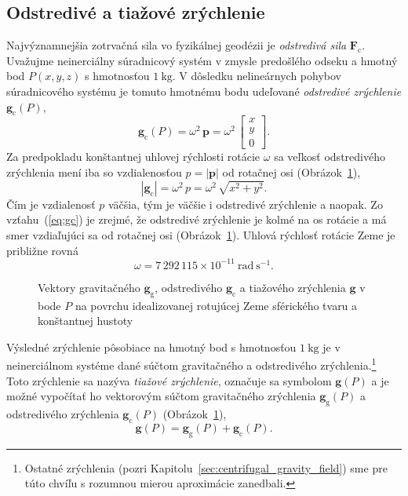 \documentclass[a4paper, 12pt]{book}
\newcommand{\gidx}{\mathrm g}
\newcommand{\cidx}{\mathrm c}
\let\vec\mathbf
\begin{document}
\subsection{Odstredivé a tiažové zrýchlenie}

Najvýznamnejšia zotrvačná sila vo fyzikálnej geodézii je \emph{odstredivá sila} 
$\vec F_\cidx$.  Uvažujme neinerciálny súradnicový systém v zmysle predošlého 
odseku a hmotný bod $P(x, y, z)$ s hmotnosťou $1\ \mathrm{kg}$.  V dôsledku 
nelineárnych pohybov súradnicového systému je tomuto hmotnému bodu udeľované 
\emph{odstredivé zrýchlenie} $\vec g_\cidx(P)$,
%
\begin{equation}
\label{eq:gc}
\vec g_\cidx(P) = \omega^2 \, \vec p =
%
\omega^2 \, \begin{bmatrix}
x\\
y\\
0
\end{bmatrix}
{.}
\end{equation}
%
Za predpokladu konštantnej uhlovej rýchlosti rotácie $\omega$ sa veľkosť 
odstredivého zrýchlenia mení iba so vzdialenosťou $p = | \vec p |$ od rotačnej 
osi (Obrázok~\ref{fig:gravity_vector}),
%
\begin{equation}
| \vec g_\cidx | = \omega^2 \, p = \omega^2 \, \sqrt{x^2 + y^2}{.}
\end{equation}
%
Čím je vzdialenosť $p$ väčšia, tým je väčšie i odstredivé zrýchlenie a naopak.  
Zo vzťahu~(\ref{eq:gc}) je zrejmé, že odstredivé zrýchlenie je kolmé na os 
rotácie a má smer vzdiaľujúci sa od rotačnej osi 
(Obrázok~\ref{fig:gravity_vector}).  Uhlová rýchlosť rotácie Zeme je približne 
rovná \citep{GRS80}
%
\begin{equation}
\omega = 7\, 292\, 115 \times 10^{-11} \ \mathrm{rad} \ \mathrm{s}^{-1}{.}
\end{equation}

\begin{figure}
\centering

\caption{Vektory gravitačného $\vec g_\gidx$, odstredivého $\vec g_\cidx$ 
a tiažového zrýchlenia $\vec g$ v bode $P$ na povrchu idealizovanej rotujúcej 
Zeme sférického tvaru a konštantnej hustoty}
\label{fig:gravity_vector}
\end{figure}

Výsledné zrýchlenie pôsobiace na hmotný bod s hmotnosťou $1 \ \mathrm{kg}$ je 
v neinerciálnom systéme dané súčtom gravitačného a odstredivého 
zrýchlenia.\footnote{Ostatné zrýchlenia (pozri 
Kapitolu~\ref{sec:centrifugal_gravity_field}) sme pre túto chvíľu s rozumnou 
mierou aproximácie zanedbali.}  Toto zrýchlenie sa nazýva \emph{tiažové 
zrýchlenie}, označuje sa symbolom $\vec g(P)$ a je možné vypočítať ho 
vektorovým súčtom gravitačného zrýchlenia $\vec g_\gidx(P)$ a odstredivého 
zrýchlenia $\vec g_\cidx(P)$ (Obrázok~\ref{fig:gravity_vector}),
%
\begin{equation}
\label{eq:g}
\vec g(P) = \vec g_\gidx(P) + \vec g_\cidx(P){.}
\end{equation}
\end{document}
